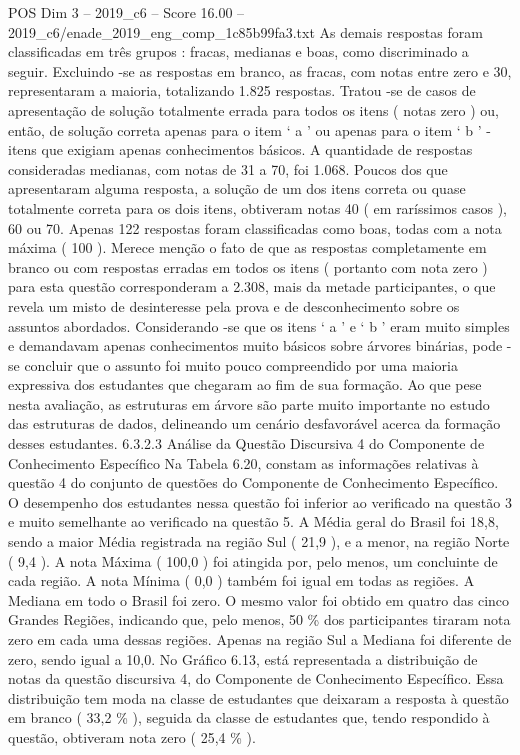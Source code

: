 \begin{textsample}{POS Dim 3 – 2019\_c6 – Score 16.00 – 2019\_c6/enade\_2019\_eng\_comp\_1c85b99fa3.txt}
As demais respostas foram classificadas em três grupos : fracas, medianas e boas, como discriminado a seguir.
Excluindo -se as respostas em branco, as fracas, com notas entre zero e 30, representaram a maioria, totalizando 1.825 respostas.
Tratou -se de casos de apresentação de solução totalmente errada para todos os itens ( notas zero ) ou, então, de solução correta apenas para o item ‘ a ’ ou apenas para o item ‘ b ’ - itens que exigiam apenas conhecimentos básicos.
A quantidade de respostas consideradas medianas, com notas de 31 a 70, foi 1.068.
Poucos dos que apresentaram alguma resposta, a solução de um dos itens correta ou quase totalmente correta para os dois itens, obtiveram notas 40 ( em raríssimos casos ), 60 ou 70.
Apenas 122 respostas foram classificadas como boas, todas com a nota máxima ( 100 ).
Merece menção o fato de que as respostas completamente em branco ou com respostas erradas em todos os itens ( portanto com nota zero ) para esta questão corresponderam a 2.308, mais da metade participantes, o que revela um misto de desinteresse pela prova e de desconhecimento sobre os assuntos abordados.
Considerando -se que os itens ‘ a ’ e ‘ b ’ eram muito simples e demandavam apenas conhecimentos muito básicos sobre árvores binárias, pode -se concluir que o assunto foi muito pouco compreendido por uma maioria expressiva dos estudantes que chegaram ao fim de sua formação.
Ao que pese nesta avaliação, as estruturas em árvore são parte muito importante no estudo das estruturas de dados, delineando um cenário desfavorável acerca da formação desses estudantes. 6.3.2.3 Análise da Questão Discursiva 4 do Componente de Conhecimento Específico Na Tabela 6.20, constam as informações relativas à questão 4 do conjunto de questões do Componente de Conhecimento Específico.
O desempenho dos estudantes nessa questão foi inferior ao verificado na questão 3 e muito semelhante ao verificado na questão 5.
A Média geral do Brasil foi 18,8, sendo a maior Média registrada na região Sul ( 21,9 ), e a menor, na região Norte ( 9,4 ).
A nota Máxima ( 100,0 ) foi atingida por, pelo menos, um concluinte de cada região.
A nota Mínima ( 0,0 ) também foi igual em todas as regiões.
A Mediana em todo o Brasil foi zero.
O mesmo valor foi obtido em quatro das cinco Grandes Regiões, indicando que, pelo menos, 50 \% dos participantes tiraram nota zero em cada uma dessas regiões.
Apenas na região Sul a Mediana foi diferente de zero, sendo igual a 10,0.
No Gráfico 6.13, está representada a distribuição de notas da questão discursiva 4, do Componente de Conhecimento Específico.
Essa distribuição tem moda na classe de estudantes que deixaram a resposta à questão em branco ( 33,2 \% ), seguida da classe de estudantes que, tendo respondido à questão, obtiveram nota zero ( 25,4 \% ).

\end{textsample}
